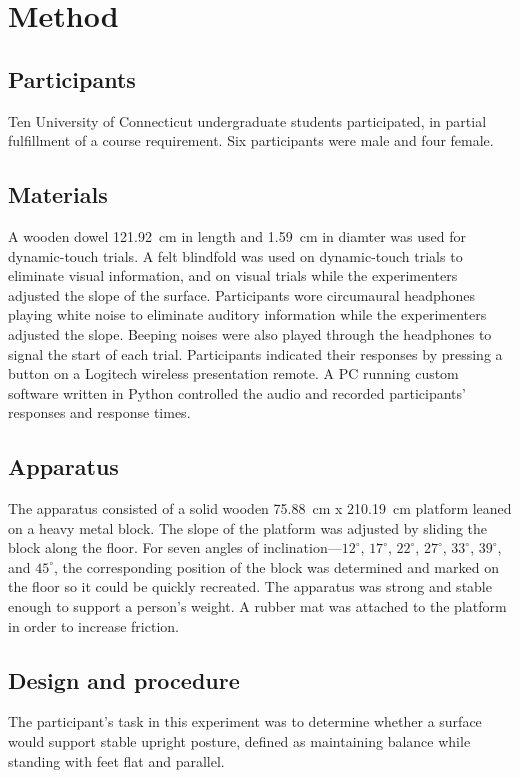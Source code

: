 \documentclass{article}
\begin{document}
\section{Method}
\subsection{Participants}
Ten University of Connecticut undergraduate students participated, in partial fulfillment of a course requirement. Six participants were male and four female.

\subsection{Materials}
A wooden dowel 121.92~cm in length and 1.59~cm in diamter was used for dynamic-touch trials. A felt blindfold was used on dynamic-touch trials to eliminate visual information, and on visual trials while the experimenters adjusted the slope of the surface. Participants wore circumaural headphones playing white noise to eliminate auditory information while the experimenters adjusted the slope. Beeping noises were also played through the headphones to signal the start of each trial.  Participants indicated their responses by pressing a button on a Logitech wireless presentation remote. A PC running custom software written in Python controlled the audio and recorded participants' responses and response times.

\subsection{Apparatus}
The apparatus consisted of a solid wooden 75.88~cm x 210.19~cm platform leaned on a heavy metal block. The slope of the platform was adjusted by sliding the block along the floor. For seven angles of inclination---$12^\circ$, $17^\circ$, $22^\circ$, $27^\circ$, $33^\circ$, $39^\circ$, and $45^\circ$, the corresponding position of the block was determined and marked on the floor so it could be quickly recreated. The apparatus was strong and stable enough to support a person's weight. A rubber mat was attached to the platform in order to increase friction.

\subsection{Design and procedure}
The participant's task in this experiment was to determine whether a surface would support stable upright posture, defined as maintaining balance while standing with feet flat and parallel.
\end{document}
